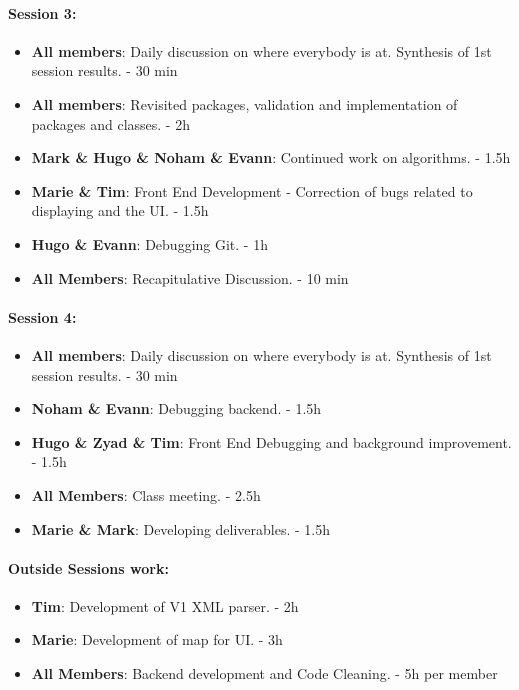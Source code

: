 \documentclass{article}
\begin{document}
\paragraph{Session 3:}
\begin{itemize}
    \item \textbf{All members}: Daily discussion on where everybody is at. Synthesis of 1st session results. - 30 min
    \item \textbf{All members}: Revisited packages, validation and implementation of packages and classes. - 2h
    \item \textbf{Mark \& Hugo \& Noham \& Evann}: Continued work on algorithms. - 1.5h
    \item \textbf{Marie \& Tim}: Front End Development - Correction of bugs related to displaying and the UI. - 1.5h
    \item \textbf{Hugo \& Evann}: Debugging Git. - 1h
    \item \textbf{All Members}: Recapitulative Discussion. - 10 min
\end{itemize}

\paragraph{Session 4:}
\begin{itemize}
    \item \textbf{All members}: Daily discussion on where everybody is at. Synthesis of 1st session results. - 30 min
    \item \textbf{Noham \& Evann}: Debugging backend. - 1.5h
    \item \textbf{Hugo \& Zyad \& Tim}: Front End Debugging and background improvement. - 1.5h
    \item \textbf{All Members}: Class meeting. - 2.5h
    \item \textbf{Marie \& Mark}: Developing deliverables. - 1.5h
\end{itemize}

\paragraph{Outside Sessions work:}
\begin{itemize}
    \item \textbf{Tim}: Development of V1 XML parser. - 2h
    \item \textbf{Marie}: Development of map for UI. - 3h
    \item \textbf{All Members}: Backend development and Code Cleaning. - 5h per member
\end{itemize}
\end{document}
